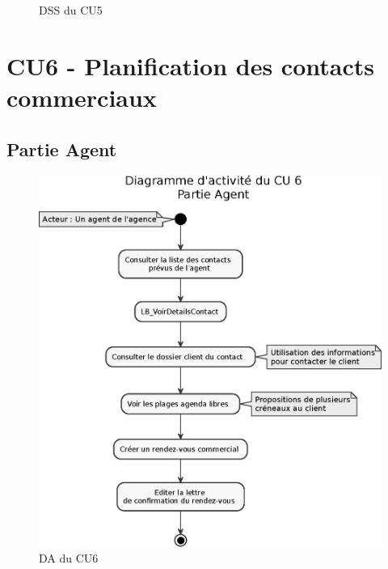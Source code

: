 \begin{figure}[H]
\noindent{}
\caption{DSS du CU5}
\end{figure}

\clearpage
\section{CU6 - Planification des contacts commerciaux}

\subsection{Partie Agent}
\begin{figure}[H]
\centering
\includegraphics[width=\textwidth]{figures/eps/DA_CU6_partieAgent.eps}
\caption{DA du CU6}
\end{figure}

